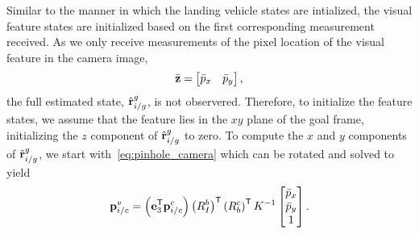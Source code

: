 Similar to the manner in which the landing vehicle states are intialized,
the visual feature states are initialized based on the first corresponding measurement received.
As we only receive measurements of the pixel
location of the visual feature in the camera image,
\begin{equation}
  \bar{\boldsymbol{\mathrm{z}}} = \begin{bmatrix} \bar{p}_x & \bar{p}_y \end{bmatrix}
  \label{eq:pixel_meas},
\end{equation}
the full estimated state, $\hat{\boldsymbol{\mathrm{r}}}_{i/g}^g$, is not observered.
Therefore, to initialize
the feature states, we assume that the feature lies in the $xy$ plane of the
goal frame, initializing the $z$ component of $\hat{\boldsymbol{\mathrm{r}}}_{i/g}^g$ to zero.
To compute the
$x$ and $y$ components of $\hat{\boldsymbol{\mathrm{r}}}_{i/g}^g$,
we start with~\eqref{eq:pinhole_camera}
which can be rotated and solved to yield
\begin{equation}
 \boldsymbol{\mathrm{p}}_{i/c}^v
  =
  \left( \boldsymbol{\mathrm{e}}_3^{\mathsf{T}} \boldsymbol{\mathrm{p}}_{i/c}^c \right) \left( R_I^b
  \right)^{\mathsf{T}} \left( R_b^c \right)^{\mathsf{T}} K^{-1} \begin{bmatrix}
    \bar{p}_x \\ \bar{p}_y \\ 1
  \end{bmatrix}.
\end{equation}
